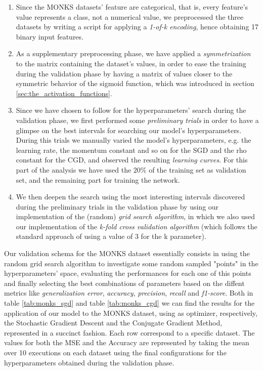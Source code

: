         \begin{enumerate}
            \item Since the MONKS datasets’ feature are categorical, that is, every feature’s value represents
            a class, not a numerical value, we preprocessed the three datasets by writing a script
            for applying a \textit{1-of-k encoding}, hence obtaining 17 binary input features.
            \item As a supplementary preprocessing phase, we have applied a \textit{symmetrization} to the
            matrix containing the dataset’s values, in order to ease the training during the validation phase
            by having a matrix of values closer to the symmetric behavior of the sigmoid function, which was
            introduced in section \ref{sec:the_activation_functions}.
            \item Since we have chosen to follow \cite{Bergstra:2012:RSH:2188385.2188395} for the
            hyperparameters' search during the validation phase, we first performed some
            \textit{preliminary trials} in order to have a glimpse on the best intervals for searching our
            model's hyperparameters. During this trials we manually varied the model's hyperparameters, e.g.
            the learning rate, the momentum constant and so on for the SGD and the rho constant for the CGD,
            and observed the resulting \textit{learning curves}. For this part of the analysis we have used
            the $20\%$ of the training set as validation set, and the remaining part for training the network.
            \item We then deepen the search using the most interesting intervals discovered during the
            preliminary trials in the validation phase by using our implementation of the (random)
            \textit{grid search algorithm}, in which we also used our implementation of the
            \textit{k-fold cross validation algorithm} (which follows the standard approach of using a value
            of 3 for the k parameter).
        \end{enumerate}

        Our validation schema for the MONKS dataset essentially consists in using the random grid
        search
        algorithm to investigate some random sampled "points" in the hyperparameters' space, evaluating the
        performances for each one of this points and finally selecting the best combinations of parameters
        based
        on the diffent metrics like \textit{generalization error}, \textit{accuracy}, \textit{precision},
        \textit{recall} and \textit{f1-score}. Both in table \ref{tab:monks_sgd} and table
        \ref{tab:monks_cgd} we can find the results for the application of our model to the MONKS dataset,
        using as optimizer, respectively, the Stochastic Gradient Descent and the Conjugate Gradient Method,
        represented in a succinct fashion. Each row correspond to a specific dataset. The values for both the
        MSE and the Accuracy are represented by taking the mean over 10 executions on each dataset using
        the final configurations for the hyperparameters obtained during the validation phase.

